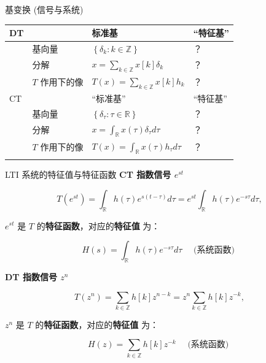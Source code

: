 \documentclass[
  ignorenonframetext,
]{beamer}
\newcounter{none} %
\begin{document}
\begin{frame}{基变换 (信号与系统)}
\protect{}\label{ux57faux53d8ux6362-ux4fe1ux53f7ux4e0eux7cfbux7edf}
{\def\LTcaptype{none} %
\begin{longtable}[]{@{}
  >{\raggedright\arraybackslash}p{}
  >{\raggedright\arraybackslash}p{}
  >{\raggedright\arraybackslash}p{}
  >{\raggedright\arraybackslash}p{}@{}}
\toprule\noalign{}
\begin{minipage}[b]{\linewidth}\raggedright
DT
\end{minipage} & \begin{minipage}[b]{\linewidth}\raggedright
\end{minipage} & \begin{minipage}[b]{\linewidth}\raggedright
标准基
\end{minipage} & \begin{minipage}[b]{\linewidth}\raggedright
``特征基''
\end{minipage} \\
\midrule\noalign{}
\endhead
& 基向量 & \(\left\{\delta_{k}: k \in \mathbb{Z}\right\}\) & ？ \\
& 分解 & \(x=\sum_{k \in \mathbb{Z}} x[k] \delta_{k}\) & ？ \\
& \(T\) 作用下的像 & \(T(x)=\sum_{k \in \mathbb{Z}} x[k] h_{k}\) & ？ \\
CT & & ``标准基'' & ``特征基'' \\
& 基向量 & \(\left\{\delta_{\tau}: \tau \in \mathbb{R}\right\}\) & ？ \\
& 分解 & \(x=\int_{\mathbb{R}} x(\tau) \delta_{\tau} d \tau\) & ？ \\
& \(T\) 作用下的像 & \(T(x)=\int_{\mathbb{R}} x(\tau) h_{\tau} d \tau\)
& ？ \\
\bottomrule\noalign{}
\end{longtable}
}
\end{frame}

\begin{frame}{LTI 系统的特征值与特征函数}
\protect{}\label{lti-ux7cfbux7edfux7684ux7279ux5f81ux503cux4e0eux7279ux5f81ux51fdux6570}
\textbf{CT 指数信号 \(e^{s t}\)}

\[
T\left(e^{s t}\right)=\int_{\mathbb{R}} h(\tau) e^{s(t-\tau)} d \tau=e^{s t} \int_{\mathbb{R}} h(\tau) e^{-s \tau} d \tau,
\]

{ \(e^{s t}\) 是 \(T\) 的\textbf{特征函数}，对应的\textbf{特征值} }为：

\[
H(s)=\int_{\mathbb{R}} h(\tau) e^{-s \tau} d \tau \quad \text { (系统函数) } 
\]

\textbf{DT 指数信号 \(z^{n}\)}

\[
T\left(z^{n}\right)=\sum_{k \in \mathbb{Z}} h[k] z^{n-k}=z^{n} \sum_{k \in \mathbb{Z}} h[k] z^{-k},
\]

{ \(z^{n}\) 是 \(T\) 的\textbf{特征函数}，对应的\textbf{特征值} }为：

\[
H(z)=\sum_{k \in \mathbb{Z}} h[k] z^{-k} \quad \text { (系统函数) }
\]
\end{frame}
\end{document}
